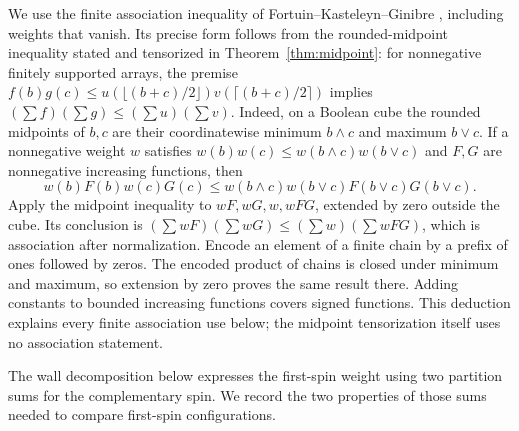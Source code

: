 \documentclass[11pt]{article}
\theoremstyle{definition}
\theoremstyle{remark}
\numberwithin{equation}{section}
\begin{document}
We use the finite association inequality of Fortuin--Kasteleyn--Ginibre
\cite{FKG1971}, including weights that vanish.  Its precise form follows
from the rounded-midpoint inequality stated and tensorized in
Theorem~\ref{thm:midpoint}: for nonnegative finitely supported arrays,
the premise
$f(b)g(c)\le u(\lfloor(b+c)/2\rfloor)v(\lceil(b+c)/2\rceil)$
implies $(\sum f)(\sum g)\le(\sum u)(\sum v)$.
Indeed, on a Boolean cube the rounded
midpoints of $b,c$ are their coordinatewise minimum $b\wedge c$ and
maximum $b\vee c$.  If a nonnegative weight $w$ satisfies
$w(b)w(c)\le w(b\wedge c)w(b\vee c)$ and $F,G$ are nonnegative
increasing functions, then
\[
 w(b)F(b)w(c)G(c)
 \le w(b\wedge c)w(b\vee c)F(b\vee c)G(b\vee c).
\]
Apply the midpoint inequality to $wF,wG,w,wFG$, extended by zero
outside the cube.  Its conclusion is
$(\sum wF)(\sum wG)\le(\sum w)(\sum wFG)$, which is association
after normalization.  Encode an element of a finite chain by a prefix
of ones followed by zeros.  The encoded product of chains is closed
under minimum and maximum, so extension by zero proves the same result
there.  Adding constants to bounded increasing functions covers signed
functions.  This deduction explains every finite association use below;
the midpoint tensorization itself uses no association statement.

The wall decomposition below expresses the first-spin weight using two
partition sums for the complementary spin.  We record the two properties
of those sums needed to compare first-spin configurations.
\end{document}
